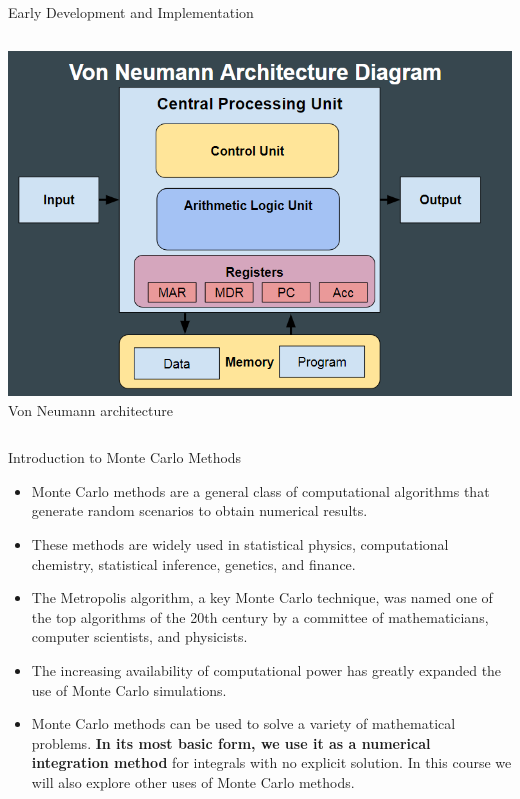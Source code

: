 \documentclass[8pt]{beamer}
\begin{document}
\begin{frame}{Early Development and Implementation}
\begin{columns}
\begin{column}{0.35\textwidth}
\begin{center}
        \includegraphics[width=\textwidth]{von-neumann-architecture-gcse-ocr.png} %
        \\[0.5em]
        \footnotesize Von Neumann architecture
        \end{center}
    \end{column}
\end{columns}
\end{frame}

\begin{frame}{Introduction to Monte Carlo Methods}
\begin{itemize}
	\item Monte Carlo methods are a general class of computational algorithms that generate random scenarios to obtain  numerical results.
    \item These methods are widely used in statistical physics, computational chemistry, statistical inference, genetics, and finance.
    \item The Metropolis algorithm, a key Monte Carlo technique, was named one of the top algorithms of the 20th century by a committee of mathematicians, computer scientists, and physicists.
    \item The increasing availability of computational power has greatly expanded the use of Monte Carlo simulations.
    \item Monte Carlo methods can be used to solve a variety of mathematical problems. \textbf{In its most basic form, we use it as a numerical integration method} for integrals with no explicit solution. In this course we will also explore other uses of Monte Carlo methods.
\end{itemize}
\end{frame}
\end{document}

